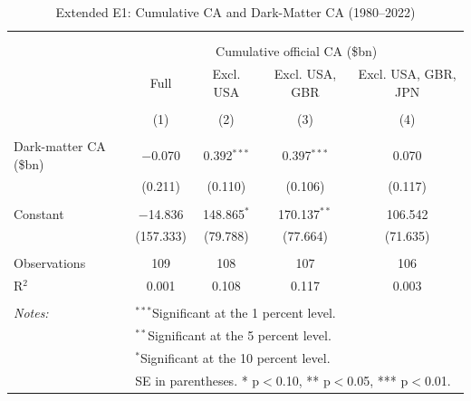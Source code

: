 \documentclass[11pt]{article}
\begin{document}
\small
\setcounter{table}{1}

\renewcommand{\thetable}{E1}
\begin{table}[!htbp] \centering 
  \caption{Extended E1: Cumulative CA and Dark-Matter CA (1980--2022)} 
  \label{tab:E1_ext} 
\begin{tabular}{@{\extracolsep{5pt}}lcccc} 
\\[-1.8ex]\hline 
\hline \\[-1.8ex] 
\\[-1.8ex] & \multicolumn{4}{c}{Cumulative official CA (\$bn)} \\ 
 & Full & Excl. USA & Excl. USA, GBR & Excl. USA, GBR, JPN \\ 
\\[-1.8ex] & (1) & (2) & (3) & (4)\\ 
\hline \\[-1.8ex] 
 Dark-matter CA (\$bn) & $-$0.070 & 0.392$^{***}$ & 0.397$^{***}$ & 0.070 \\ 
  & (0.211) & (0.110) & (0.106) & (0.117) \\ 
  & & & & \\ 
 Constant & $-$14.836 & 148.865$^{*}$ & 170.137$^{**}$ & 106.542 \\ 
  & (157.333) & (79.788) & (77.664) & (71.635) \\ 
  & & & & \\ 
Observations & 109 & 108 & 107 & 106 \\ 
R$^{2}$ & 0.001 & 0.108 & 0.117 & 0.003 \\ 
\hline \\[-1.8ex] 
\textit{Notes:} & \multicolumn{4}{l}{$^{***}$Significant at the 1 percent level.} \\ 
 & \multicolumn{4}{l}{$^{**}$Significant at the 5 percent level.} \\ 
 & \multicolumn{4}{l}{$^{*}$Significant at the 10 percent level.} \\ 
 & \multicolumn{4}{l}{SE in parentheses. * p$<$0.10, ** p$<$0.05, *** p$<$0.01.} \\ 
\end{tabular} 
\end{table} 
\end{document}
